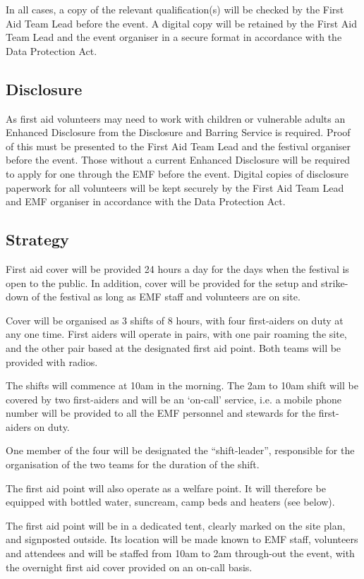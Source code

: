In all cases, a copy of the relevant qualification(s) will be checked by the
First Aid Team Lead before the event. A digital copy will be retained by the
First Aid Team Lead and the event organiser in a secure format in accordance
with the Data Protection Act.

\subsection{Disclosure}
As first aid volunteers may need to work with children or vulnerable adults an
Enhanced Disclosure from the Disclosure and Barring Service is required. Proof
of this must be presented to the First Aid Team Lead and the festival organiser
before the event. Those without a current Enhanced Disclosure will be required
to apply for one through the EMF before the event. Digital copies of disclosure
paperwork for all volunteers will be kept securely by the First Aid Team Lead and
EMF organiser in accordance with the Data Protection Act.

\subsection{Strategy}
First aid cover will be provided 24 hours a day for the days when the festival
is open to the public. In addition, cover will be provided for the setup and
strike-down of the festival as long as EMF staff and volunteers are on site.

Cover will be organised as 3 shifts of 8 hours, with four first-aiders on duty
at any one time. First aiders will operate in pairs, with one pair roaming the
site, and the other pair based at the designated first aid point. Both teams
will be provided with radios.

The shifts will commence at 10am in the morning. The 2am to 10am shift will
be covered by two first-aiders and will be an `on-call’ service, i.e. a mobile
phone number will be provided to all the EMF personnel and stewards for the
first-aiders on duty.

One member of the four will be designated the ``shift-leader'', responsible for
the organisation of the two teams for the duration of the shift.

The first aid point will also operate as a welfare point. It will therefore be
equipped with bottled water, suncream, camp beds and heaters (see below).

The first aid point will be in a dedicated tent, clearly marked on the site
plan, and signposted outside. Its location will be made known to EMF staff,
volunteers and attendees and will be staffed from 10am to 2am through-out
the event, with the overnight first aid cover provided on an on-call basis.

